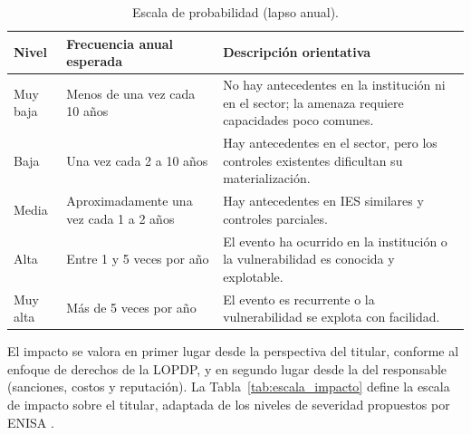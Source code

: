 \begin{table}[htbp]
  \centering
  \caption{Escala de probabilidad (lapso anual).}
  \label{tab:escala_probabilidad}
  \small
  \renewcommand{\arraystretch}{1.2}
  \begin{tabularx}{\textwidth}{|p{2.2cm}|p{3.6cm}|L|}
    \hline
    \textbf{Nivel} & \textbf{Frecuencia anual esperada} & \textbf{Descripción orientativa} \\
    \hline
    Muy baja & Menos de una vez cada 10 años & No hay antecedentes en la institución ni en el sector; la amenaza requiere capacidades poco comunes. \\
    \hline
    Baja & Una vez cada 2 a 10 años & Hay antecedentes en el sector, pero los controles existentes dificultan su materialización. \\
    \hline
    Media & Aproximadamente una vez cada 1 a 2 años & Hay antecedentes en IES similares y controles parciales. \\
    \hline
    Alta & Entre 1 y 5 veces por año & El evento ha ocurrido en la institución o la vulnerabilidad es conocida y explotable. \\
    \hline
    Muy alta & Más de 5 veces por año & El evento es recurrente o la vulnerabilidad se explota con facilidad. \\
    \hline
  \end{tabularx}
  \raggedright
\end{table}

El impacto se valora en primer lugar desde la perspectiva del titular, conforme al enfoque de derechos de la LOPDP, y en segundo lugar desde la del responsable (sanciones, costos y reputación). La Tabla~\ref{tab:escala_impacto} define la escala de impacto sobre el titular, adaptada de los niveles de severidad propuestos por ENISA \cite{enisa2013severity}.

